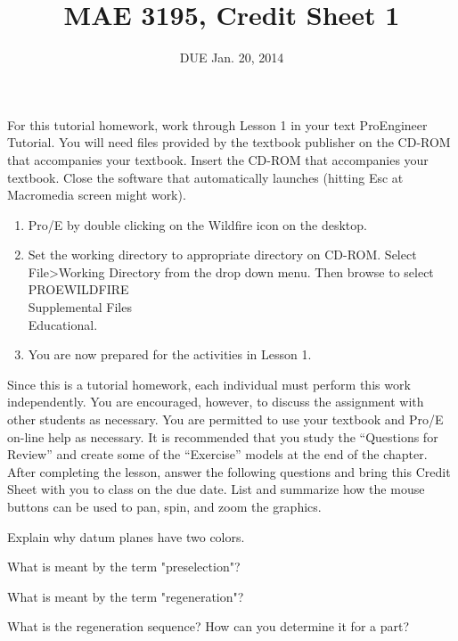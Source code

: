\documentclass{homework}
\title{MAE 3195, Credit Sheet 1}
\author{DUE Jan. 20, 2014}
\begin{document}
For this tutorial homework, work through Lesson 1 in your text ProEngineer Tutorial. You will need files provided by the textbook publisher on the CD-ROM that accompanies your textbook. Insert the CD-ROM that accompanies your textbook. Close the software that automatically launches (hitting Esc at Macromedia screen might work).

\begin{enumerate}
\item Pro/E by double clicking on the Wildfire icon on the desktop.
\item Set the working directory to appropriate directory on CD-ROM. Select File>Working Directory from the drop down menu. Then browse to select PROEWILDFIRE\\Supplemental Files\\Educational.
\item You are now prepared for the activities in Lesson 1.
\end{enumerate} 

Since this is a tutorial homework, each individual must perform this work independently. You are encouraged, however, to discuss the assignment with other students as necessary. You are permitted to use your textbook and Pro/E on-line help as necessary. It is recommended that you study the “Questions for Review” and create some of the “Exercise” models at the end of the chapter. After completing the lesson, answer the following questions and bring this Credit Sheet with you to class on the due date.
\problem{} List and summarize how the mouse buttons can be used to pan, spin, and zoom the graphics.
\solution

\problem{} Explain why datum planes have two colors.
\solution

\problem{} What is meant by the term "preselection"?
\solution

\problem{} What is meant by the term "regeneration"?
\solution

\problem{} What is the regeneration sequence? How can you determine it for a part?
\solution
\end{document}
